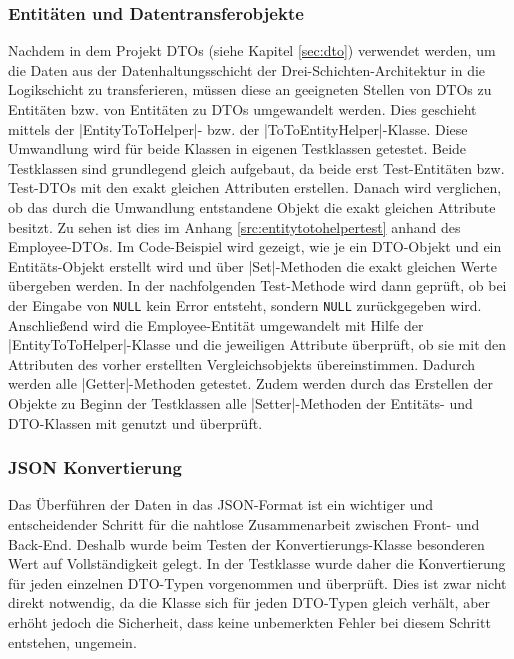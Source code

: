 \subsubsection{Entitäten und Datentransferobjekte}

Nachdem in dem Projekt \acsp{DTO} (siehe Kapitel \vref{sec:dto}) verwendet werden, um die Daten aus der Datenhaltungsschicht der Drei-Schichten-Architektur in die Logikschicht zu transferieren, müssen diese an geeigneten Stellen von \acsp{DTO} zu Entitäten bzw. von Entitäten zu \acsp{DTO}  umgewandelt werden.
Dies geschieht mittels der \jinline |EntityToToHelper|- bzw. der \jinline |ToToEntityHelper|-Klasse. Diese Umwandlung wird für beide Klassen in eigenen Testklassen getestet.
Beide Testklassen sind grundlegend gleich aufgebaut, da beide erst Test-Entitäten bzw. Test-\acsp{DTO} mit den exakt gleichen Attributen erstellen.
Danach wird verglichen, ob das durch die Umwandlung entstandene Objekt die exakt gleichen Attribute besitzt. Zu sehen ist dies im Anhang \vref{src:entitytotohelpertest} anhand des Employee-\acsp{DTO}.
Im Code-Beispiel wird gezeigt, wie je ein \acs{DTO}-Objekt und ein Entitäts-Objekt erstellt wird und über \jinline |Set|-Methoden die exakt gleichen Werte übergeben werden.
In der nachfolgenden Test-Methode wird dann geprüft, ob bei der Eingabe von \texttt{NULL} kein Error entsteht, sondern \texttt{NULL} zurückgegeben wird.
Anschließend wird die Employee-Entität umgewandelt mit Hilfe der \jinline |EntityToToHelper|-Klasse und die jeweiligen Attribute überprüft, ob sie mit den Attributen des vorher erstellten Vergleichsobjekts übereinstimmen.
Dadurch werden alle \jinline |Getter|-Methoden getestet. Zudem werden durch das Erstellen der Objekte zu Beginn der Testklassen alle \jinline |Setter|-Methoden der Entitäts- und \acs{DTO}-Klassen mit genutzt und überprüft.

\subsubsection{JSON Konvertierung}

Das Überführen der Daten in das \acs{JSON}-Format ist ein wichtiger und entscheidender Schritt für die nahtlose Zusammenarbeit zwischen Front- und Back-End.
Deshalb wurde beim Testen der Konvertierungs-Klasse besonderen Wert auf Vollständigkeit gelegt. In der Testklasse wurde daher die Konvertierung für jeden einzelnen \acs{DTO}-Typen vorgenommen und überprüft.
Dies ist zwar nicht direkt notwendig, da die Klasse sich für jeden \acs{DTO}-Typen gleich verhält, aber erhöht jedoch die Sicherheit, dass keine unbemerkten Fehler bei diesem Schritt entstehen, ungemein.


